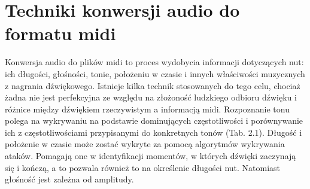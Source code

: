 \section{Techniki konwersji audio do formatu midi}

Konwersja audio do plików midi to proces wydobycia informacji dotyczących nut: ich długości, głośności, tonie, położeniu w czasie i innych właściwości muzycznych z nagrania dźwiękowego. Istnieje kilka technik stosowanych do tego celu, chociaż żadna nie jest perfekcyjna ze względu na złożoność ludzkiego odbioru dźwięku i różnice między dźwiękiem rzeczywistym a informacją midi. Rozpoznanie tonu polega na wykrywaniu na podstawie dominujących częstotliwości i porównywanie ich z częstotliwościami przypisanymi do konkretnych tonów (Tab. 2.1). Długość i położenie w czasie może zostać wykryte za pomocą algorytmów wykrywania ataków. Pomagają one w identyfikacji momentów, w których dźwięki zaczynają się i kończą, a to pozwala również to na określenie długości nut. Natomiast głośność jest zależna od amplitudy.
